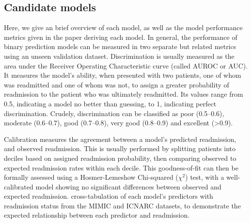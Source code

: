 \documentclass[onecolumn]{article}
\begin{document}
\subsection{Candidate models}

Here, we give an brief overview of each model, as well as the model performance metrics given in the paper deriving each model. In general, the performance of binary prediction models can be measured in two separate but related metrics using an unseen validation dataset. Discrimination is usually measured as the area under the Receiver Operating Characteristic curve (called AUROC or AUC). It measures the model's ability, when presented with two patients, one of whom was readmitted and one of whom was not, to assign a greater probability of readmission to the patient who was ultimately readmitted. Its values range from 0.5, indicating a model no better than guessing, to 1, indicating perfect discrimination. Crudely, discrimination can be classified as poor (0.5--0.6), moderate (0.6--0.7), good (0.7--0.8), very good (0.8--0.9) and excellent (>0.9).

Calibration measures the agreement between a model's predicted readmission, and observed readmission. This is usually performed by splitting patients into deciles based on assigned readmission probability, then comparing observed to expected readmission rates within each decile. This goodness-of-fit can then be formally assessed using a Hosmer-Lemeshow Chi-squared ($ \chi^{2} $) test, with a well-calibrated model showing no significant differences between observed and expected readmission.  cross-tabulation of each model's predictors with readmission status from the MIMIC and ICNARC datasets, to demonstrate the expected relationship between each predictor and readmission.
\end{document}
